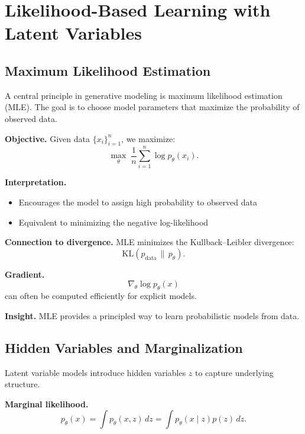 \chapter{Likelihood-Based Learning with Latent Variables}

\section{Maximum Likelihood Estimation}

A central principle in generative modeling is maximum likelihood estimation (MLE). The goal is to choose model parameters that maximize the probability of observed data.

\medskip

\noindent
\textbf{Objective.}  
Given data $\{x_i\}_{i=1}^n$, we maximize:
\[
\max_\theta \; \frac{1}{n} \sum_{i=1}^n \log p_\theta(x_i).
\]

\medskip

\noindent
\textbf{Interpretation.}
\begin{itemize}
    \item Encourages the model to assign high probability to observed data
    \item Equivalent to minimizing the negative log-likelihood
\end{itemize}

\medskip

\noindent
\textbf{Connection to divergence.}  
MLE minimizes the Kullback--Leibler divergence:
\[
\mathrm{KL}(p_{\text{data}} \,\|\, p_\theta).
\]

\medskip

\noindent
\textbf{Gradient.}
\[
\nabla_\theta \log p_\theta(x)
\]
can often be computed efficiently for explicit models.

\medskip

\noindent
\textbf{Insight.}  
MLE provides a principled way to learn probabilistic models from data.

\section{Hidden Variables and Marginalization}

Latent variable models introduce hidden variables $z$ to capture underlying structure.

\medskip

\noindent
\textbf{Marginal likelihood.}
\[
p_\theta(x) = \int p_\theta(x, z) \, dz = \int p_\theta(x \mid z) p(z) \, dz.
\]

